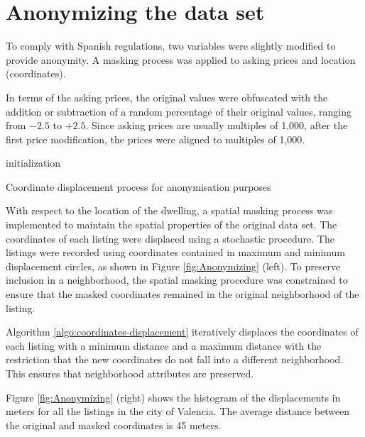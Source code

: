 \documentclass[Royal,times,sageh]{sagej}
\begin{document}
\hypertarget{anonymizing}{%
\section{Anonymizing the data set}\label{anonymizing}}

To comply with Spanish regulations, two variables were slightly modified
to provide anonymity. A masking process was applied to asking prices and
location (coordinates).

In terms of the asking prices, the original values were obfuscated with
the addition or subtraction of a random percentage of their original
values, ranging from \(-2.5%
\) to \(+2.5%
\). Since asking prices are usually multiples of 1,000, after the first
price modification, the prices were aligned to multiples of 1,000.

\begin{algorithm}[!ht]
 initialization\;
 \caption{Coordinate displacement process for anonymisation purposes}
 \label{algo:coordinates-displacement}
\end{algorithm}

With respect to the location of the dwelling, a spatial masking process
was implemented to maintain the spatial properties of the original data
set. The coordinates of each listing were displaced using a stochastic
procedure. The listings were recorded using coordinates contained in
maximum and minimum displacement circles, as shown in Figure
\ref{fig:Anonymizing} (left). To preserve inclusion in a neighborhood,
the spatial masking procedure was constrained to ensure that the masked
coordinates remained in the original neighborhood of the listing.

Algorithm \ref{algo:coordinates-displacement} iteratively displaces the
coordinates of each listing with a minimum distance and a maximum
distance with the restriction that the new coordinates do not fall into
a different neighborhood. This ensures that neighborhood attributes are
preserved.

Figure \ref{fig:Anonymizing} (right) shows the histogram of the
displacements in meters for all the listings in the city of Valencia.
The average distance between the original and masked coordinates is 45
meters.
\end{document}
